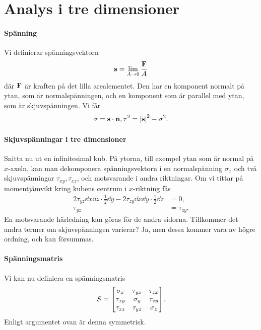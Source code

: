 \section{Analys i tre dimensioner}

\paragraph{Spänning}
Vi definierar spänningsvektorn
\begin{align*}
	\vb{s} = \lim\limits_{A \to 0}\frac{\vb{F}}{A}
\end{align*}
där $\vb{F}$ är kraften på det lilla arealementet. Den har en komponent normalt på ytan, som är normalspänningen, och en komponent som är parallel med ytan, som är skjuvspänningen. Vi får
\begin{align*}
	\sigma = \vb{s}\cdot\vb{n}, \tau^{2} = \abs{\vb{s}}^{2} - \sigma^{2}.
\end{align*}

\paragraph{Skjuvspänningar i tre dimensioner}
Snitta nu ut en infinitesimal kub. På ytorna, till exempel ytan som är normal på $x$-axeln, kan man dekomponera spänningsvektorn i en normalspänning $\sigma_{x}$ och två skjuvspänningar $\tau_{xy}, \tau_{xz}$, och motsvarande i andra riktningar. Om vi tittar på momentjämvikt kring kubens centrum i $x$-riktning fås
\begin{align*}
	2\tau_{yz}\dd{x}\dd{z}\cdot\frac{1}{2}\dd{y} - 2\tau_{zy}\dd{x}\dd{y}\cdot\frac{1}{2}\dd{z}        &= 0, \\
	\tau_{yz} &= \tau_{zy}.
\end{align*}
En motsvarande härledning kan göras för de andra sidorna. Tillkommer det andra termer om skjuvspänningen varierar? Ja, men dessa kommer vara av högre ordning, och kan försummas.

\paragraph{Spänningsmatris}
Vi kan nu definiera en spänningsmatris
\begin{align*}
	S =
	\mqty[
		\sigma_{x} & \tau_{yx}  & \tau_{zx} \\
		\tau_{xy}  & \sigma_{y} & \tau_{zy} \\
		\tau_{xz}  & \tau_{yz}  & \sigma_{z}
	].
\end{align*}
Enligt argumentet ovan är denna symmetrisk.

